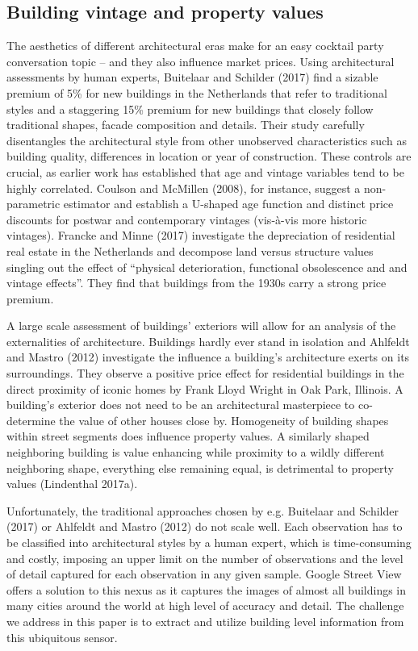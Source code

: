 \documentclass[]{article}
\begin{document}
\hypertarget{building-vintage-and-property-values}{%
\subsection{Building vintage and property
values}\label{building-vintage-and-property-values}}

The aesthetics of different architectural eras make for an easy cocktail
party conversation topic -- and they also influence market prices. Using
architectural assessments by human experts, Buitelaar and Schilder
(2017) find a sizable premium of 5\% for new buildings in the
Netherlands that refer to traditional styles and a staggering 15\%
premium for new buildings that closely follow traditional shapes, facade
composition and details. Their study carefully disentangles the
architectural style from other unobserved characteristics such as
building quality, differences in location or year of construction. These
controls are crucial, as earlier work has established that age and
vintage variables tend to be highly correlated. Coulson and McMillen
(2008), for instance, suggest a non-parametric estimator and establish a
U-shaped age function and distinct price discounts for postwar and
contemporary vintages (vis-à-vis more historic vintages). Francke and
Minne (2017) investigate the depreciation of residential real estate in
the Netherlands and decompose land versus structure values singling out
the effect of ``physical deterioration, functional obsolescence and and
vintage effects''. They find that buildings from the 1930s carry a
strong price premium.

A large scale assessment of buildings' exteriors will allow for an
analysis of the externalities of architecture. Buildings hardly ever
stand in isolation and Ahlfeldt and Mastro (2012) investigate the
influence a building's architecture exerts on its surroundings. They
observe a positive price effect for residential buildings in the direct
proximity of iconic homes by Frank Lloyd Wright in Oak Park, Illinois. A
building's exterior does not need to be an architectural masterpiece to
co-determine the value of other houses close by. Homogeneity of building
shapes within street segments does influence property values. A
similarly shaped neighboring building is value enhancing while proximity
to a wildly different neighboring shape, everything else remaining
equal, is detrimental to property values (Lindenthal 2017a).

Unfortunately, the traditional approaches chosen by e.g. Buitelaar and
Schilder (2017) or Ahlfeldt and Mastro (2012) do not scale well. Each
observation has to be classified into architectural styles by a human
expert, which is time-consuming and costly, imposing an upper limit on
the number of observations and the level of detail captured for each
observation in any given sample. Google Street View offers a solution to
this nexus as it captures the images of almost all buildings in many
cities around the world at high level of accuracy and detail. The
challenge we address in this paper is to extract and utilize building
level information from this ubiquitous sensor.
\end{document}
